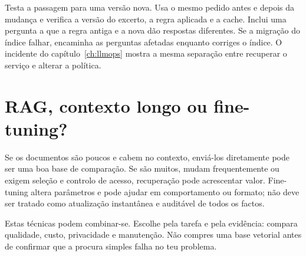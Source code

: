 Testa a passagem para uma versão nova. Usa o mesmo pedido antes e depois da mudança e verifica a versão do excerto, a regra aplicada e a cache. Inclui uma pergunta a que a regra antiga e a nova dão respostas diferentes. Se a migração do índice falhar, encaminha as perguntas afetadas enquanto corriges o índice. O incidente do capítulo~\ref{ch:llmops} mostra a mesma separação entre recuperar o serviço e alterar a política.

\section{RAG, contexto longo ou fine-tuning?}
Se os documentos são poucos e cabem no contexto, enviá-los diretamente pode ser uma boa base de comparação. Se são muitos, mudam frequentemente ou exigem seleção e controlo de acesso, recuperação pode acrescentar valor. Fine-tuning altera parâmetros e pode ajudar em comportamento ou formato; não deve ser tratado como atualização instantânea e auditável de todos os factos.

Estas técnicas podem combinar-se. Escolhe pela tarefa e pela evidência: compara qualidade, custo, privacidade e manutenção. Não compres uma base vetorial antes de confirmar que a procura simples falha no teu problema.

